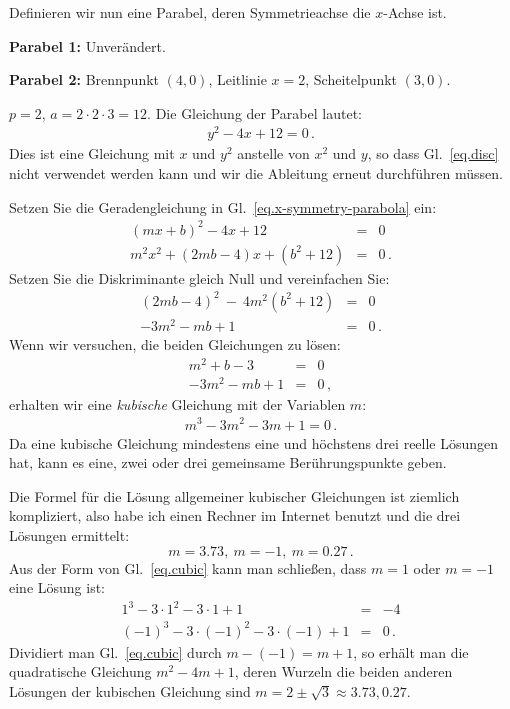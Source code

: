 
\begin{example}\mbox{}

\noindent{}Definieren wir nun eine Parabel, deren Symmetrieachse die $x$-Achse ist.

\noindent\textbf{Parabel 1:} Unverändert. 

\noindent\textbf{Parabel 2:} Brennpunkt $(4,0)$, Leitlinie $x=2$, Scheitelpunkt $(3,0)$.

\noindent{}$p=2$, $a=2\cdot 2\cdot 3=12$. Die Gleichung der Parabel lautet:
\begin{align}
y^2-4x+12 = 0\,.\label{eq.x-symmetry-parabola}
\end{align}
Dies ist eine Gleichung mit $x$ und $y^2$ anstelle von $x^2$ und $y$, so dass Gl.~\ref{eq.disc} nicht verwendet werden kann und wir die Ableitung erneut durchführen müssen.

Setzen Sie die Geradengleichung in Gl.~\ref{eq.x-symmetry-parabola} ein:
\begin{eqnarray*}
(mx+b)^2-4x+12&=&0\\
m^2x^2+(2mb-4)x+(b^2+12)&=&0\,.
\end{eqnarray*}
Setzen Sie die Diskriminante gleich Null und vereinfachen Sie:
\begin{eqnarray*}
(2mb-4)^2\:-\:4m^2(b^2+12)&=&0\\
-3m^2-mb+1&=&0\,.
\end{eqnarray*}
Wenn wir versuchen, die beiden Gleichungen zu lösen:
\begin{eqnarray*}
m^2+b-3&=&0\\
-3m^2-mb+1&=&0\,,
\end{eqnarray*}
erhalten wir eine \emph{kubische} Gleichung mit der Variablen $m$:
\begin{align}
m^3-3m^2-3m+1=0\,.\label{eq.cubic}
\end{align}
Da eine kubische Gleichung mindestens eine und höchstens drei reelle Lösungen hat, kann es eine, zwei oder drei gemeinsame Berührungspunkte geben.

Die Formel für die Lösung allgemeiner kubischer Gleichungen ist ziemlich kompliziert, also habe ich einen Rechner im Internet benutzt und die drei Lösungen ermittelt:
\[m=3.73,\:m=-1,\:m=0.27\,.\]
Aus der Form von Gl.~\ref{eq.cubic} kann man schließen, dass $m=1$ oder $m=-1$ eine Lösung ist:
\begin{eqnarray*}
1^3-3\cdot 1^2-3\cdot 1+1&=&-4\\
(-1)^3-3\cdot (-1)^2-3\cdot(-1)+1&=&0\,.
\end{eqnarray*}
Dividiert man Gl.~\ref{eq.cubic} durch $m-(-1)=m+1$, so erhält man die quadratische Gleichung $m^2-4m+1$, deren Wurzeln die beiden anderen Lösungen der kubischen Gleichung sind $m=2\pm\sqrt{3}\approx 3.73, 0.27$.
\end{example}


